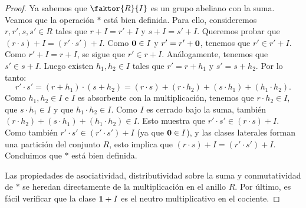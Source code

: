 \begin{proof}
Ya sabemos que $\faktor{R}{I}$ es un grupo abeliano con la suma. Veamos que la operación $\ast$ está bien definida. Para ello, consideremos $r, r', s, s' \in R$ tales que $r + I = r'+  I$ y $s + I = s' + I$. Queremos probar que $(r \cdot s) + I  = (r' \cdot s') +I$. Como $\mathbf{0} \in I$ y $r' = r' + \mathbf{0}$, tenemos que $r' \in r' + I$. Como $r' + I = r + I$, se sigue que $r' \in r + I$. Análogamente, tenemos que $s' \in s + I$. Luego existen $h_1, h_2 \in I$ tales que $r' = r + h_1$ y $s' = s + h_2$. Por lo tanto:
$$r' \cdot s' = (r + h_1) \cdot (s + h_2) = (r \cdot s) + (r \cdot h_2) + (s \cdot h_1) + (h_1 \cdot h_2).$$
Como $h_1, h_2 \in I$ e $I$ es absorbente con la multiplicación, tenemos que $r \cdot h_2 \in I$, que $s \cdot h_1 \in I$ y que $h_1 \cdot h_2 \in I$. Como $I$ es cerrado bajo la suma, también $(r \cdot h_2) + (s \cdot h_1) + (h_1 \cdot h_2) \in I$. Esto muestra que $r' \cdot s' \in (r \cdot s) + I$. Como también $r' \cdot s' \in (r' \cdot s') + I$ (ya que $\mathbf{0} \in I$), y las clases laterales forman una partición del conjunto $R$, esto implica que $(r \cdot s) + I = (r' \cdot s') + I$. Concluimos que $\ast$ está bien definida.

Las propiedades de asociatividad, distributividad sobre la suma y conmutatividad de $\ast$ se heredan directamente de la multiplicación en el anillo $R$. Por último, es fácil verificar que la clase $\mathbf{1} + I$ es el neutro multiplicativo en el cociente. 
\end{proof}

